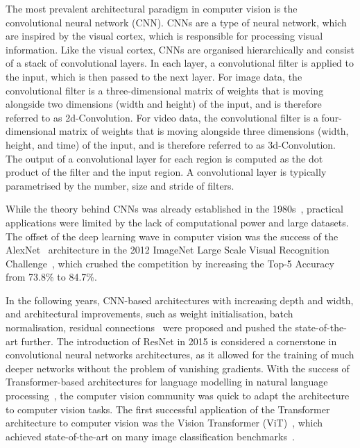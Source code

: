 \documentclass[a4paper]{article}
\begin{document}
The most prevalent architectural paradigm in computer vision is the
convolutional neural network (CNN). CNNs are a type of neural network, which
are inspired by the visual cortex, which is responsible for processing visual
information. Like the visual cortex, CNNs are organised hierarchically and
consist of a stack of convolutional layers. In each layer, a convolutional
filter is applied to the input, which is then passed to the next layer. For
image data, the convolutional filter is a three-dimensional matrix of weights
that is moving alongside two dimensions (width and height) of the input, and
is therefore referred to as 2d-Convolution. For video data, the convolutional
filter is a four-dimensional matrix of weights that is moving alongside three
dimensions (width, height, and time) of the input, and is therefore referred
to as 3d-Convolution. The output of a convolutional layer for each region is
computed as the dot product of the filter and the input region. A
convolutional layer is typically parametrised by the number, size and stride
of filters.


While the theory behind CNNs was already established in the
1980s~\cite{lenet}, practical applications were limited by the lack of
computational power and large datasets. The offset of the deep learning wave
in computer vision was the success of the AlexNet~\cite{alexnet} architecture
in the 2012 ImageNet Large Scale Visual Recognition Challenge~\cite{imagenet},
which crushed the competition by increasing the Top-5 Accuracy from 73.8\% to
84.7\%.

In the following years, CNN-based architectures with increasing depth and
width, and architectural improvements, such as weight initialisation, batch
normalisation, residual connections~\cite{vgg, googlenet, resnet, xception}
were proposed and pushed the state-of-the-art further. The introduction of
ResNet in 2015 is considered a cornerstone in convolutional neural networks
architectures, as it allowed for the training of much deeper networks without
the problem of vanishing gradients. With the success of Transformer-based
architectures for language modelling in natural language
processing~\cite{transformer}, the computer vision community was quick to
adapt the architecture to computer vision tasks. The first successful
application of the Transformer architecture to computer vision was the Vision
Transformer (ViT)~\cite{vit}, which achieved state-of-the-art on many image
classification benchmarks~\cite{imagenet}.
\end{document}
